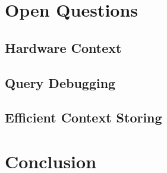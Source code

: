 \documentclass[runningheads]{llncs}
\begin{document}
\section{Open Questions} \label{sec:OPEN_QUESTIONS}
\subsection{Hardware Context}
\subsection{Query Debugging}
\subsection{Efficient Context Storing}

\section{Conclusion} \label{sec:CONCLUSION}

%

\end{document}
